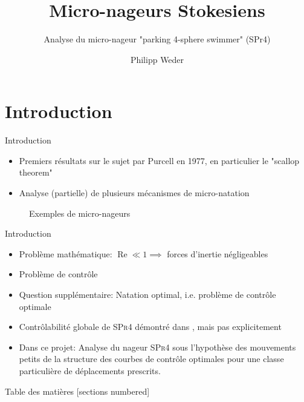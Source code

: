 \documentclass[10pt, envcountsect]{beamer}
\title{Micro-nageurs Stokesiens}
\subtitle{Analyse du micro-nageur "parking 4-sphere swimmer" (SPr4)}
\date{}
\author{Philipp Weder}
\institute{CMAP - Ecole Polytechnique}
\theoremstyle{plain}
\DeclareMathOperator{\re}{Re}
\begin{document}
\maketitle


\section[Introduction]{Introduction}

\begin{frame}{Introduction}
\begin{itemize}
\item Premiers résultats sur le sujet par Purcell en 1977, en particulier le "scallop theorem"
\item Analyse (partielle) de plusieurs mécanismes de micro-natation
\end{itemize}
\begin{figure}[h]
\centering
{} 
\caption{Exemples de micro-nageurs}
\label{fig:swimmers}
\end{figure}


\end{frame}

\begin{frame}{Introduction}
\begin{itemize}
\item Problème mathématique: $\re \ll 1 \implies$ forces d'inertie négligeables
\item Problème de contrôle
\item Question supplémentaire: Natation optimal, i.e. problème de contrôle optimale
\item Contrôlabilité globale de \textsc{SPr4} démontré dans \cite{Alouges2013}, mais pas explicitement
\item Dans ce projet: Analyse du nageur \textsc{SPr4} sous l'hypothèse des mouvements petits de la structure des courbes de contrôle optimales pour une classe particulière de déplacements prescrits.
\end{itemize}
\end{frame}

\begin{frame}{Table des matières}
  [sections numbered]
  \tableofcontents[hideallsubsections]
\end{frame}
\end{document}
